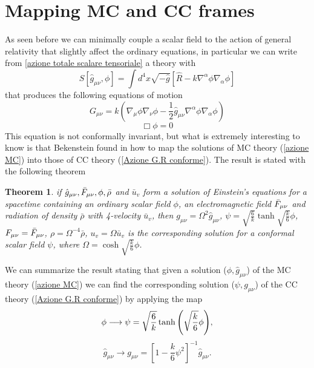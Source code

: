 \section{Mapping MC and CC frames} \label{Mapping MC and CC frames}
As seen before we can minimally couple a scalar field to the action of general relativity that slightly affect the ordinary equations, in particular we can write from \ref{azione totale scalare tensoriale} a theory with
\begin{equation}
    S[\hat{g}_{\mu \nu}, \phi] = \int d^4x \sqrt{-\hat{g}}\left[\hat{R}-k\nabla^{\alpha}\phi \nabla_{\alpha}\phi\right]
    \label{azione MC}
\end{equation}
that produces the following equations of motion
\begin{equation}
    G_{\mu \nu} = k \left(\nabla_{\mu}\phi \nabla_{\nu}\phi -\frac{1}{2}\hat{g}_{\mu \nu}\nabla^{\alpha}\phi \nabla_{\alpha}\phi \right)
    \label{EQ einstein MC}
\end{equation}
\begin{equation}
    \Box \phi = 0
    \label{K.G. MC}
\end{equation}
This equation is not conformally invariant, but what is extremely interesting to know is that Bekenstein found in \citep{mappaBekenstein} how to map the solutions of MC theory (\ref{azione MC}) into those of CC theory (\ref{Azione G.R conforme}).  The result is stated with the following theorem 
\theoremstyle{plain} %
\newtheorem{theorem}{Theorem}
\begin{theorem}
if \( \hat{g}_{\mu \nu}, \Bar{F}_{\mu \nu}, \phi, \bar{\rho} \) and \(\bar{u}_v\) form a solution of Einstein's equations for a spacetime containing an ordinary scalar field \(\phi\), an electromagnetic field \(\Bar{F}_{\mu \nu}\) and radiation of density \(\bar{\rho}\) with 4-velocity \(\bar{u}_v\), then $g_{\mu \nu} = \Omega^2\hat{g}_{\mu \nu}$, $\psi=  \sqrt{\frac{6}{k}}\tanh{\sqrt{\frac{k}{6}}\phi}$, $F_{\mu \nu} = \Bar{F}_{\mu \nu}$, $\rho = \Omega^{-4}\bar{\rho}$, $u_v =\Omega \bar{u}_v$ is the corresponding solution for a conformal scalar field $\psi$, where $\Omega = \cosh{\sqrt{\frac{k}{6}}\phi}$.
\end{theorem}
We can summarize the result stating that given a solution ($\phi, \hat{g}_{\mu \nu}$) of the MC theory (\ref{azione MC}) we can find the corresponding solution  ($\psi, g_{\mu \nu}$) of the CC theory (\ref{Azione G.R conforme}) by applying the map
\begin{equation}
    \phi \longrightarrow \psi = \sqrt{\frac{6}{k}}\tanh{\left(\sqrt{\frac{k}{6}}\phi\right)},
    \notag
\end{equation}
\begin{equation}
    \hat{g}_{\mu \nu} \longrightarrow g_{\mu \nu} = \left[1-\frac{k}{6}\psi^2 \right]^{-1}\hat{g}_{\mu \nu}.
    \label{mappa bekenstein}
\end{equation}


